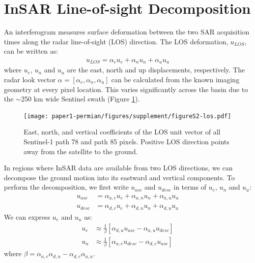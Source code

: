 \section{InSAR Line-of-sight Decomposition}
\label{sec:ch3-insar-decomp}
An interferogram measures surface deformation between the two SAR acquisition times along the radar line-of-sight (LOS) direction. The LOS deformation, $u_{LOS}$, can be written as: 
\begin{align}
	u_{LOS}= \alpha_{e} u_{e} + \alpha_{n} u_{n} + \alpha_{u} u_{u}
\end{align}
where $u_{e}$, $u_{n}$ and $u_{u}$ are the east, north and up displacements, respectively. The radar look vector $\alpha = [\alpha_e, \alpha_n, \alpha_u]$ can be calculated from the known imaging geometry at every pixel location. This varies significantly across the basin due to the $ \sim$250 km wide Sentinel swath (Figure \ref{fig:los-map}). 


%

\begin{figure}[!htbp]
	\centering
	\texttt{[image: paper1-permian/figures/supplement/figureS2-los.pdf]}
	\caption[East, north, and vertical coefficients of Sentinel-1 LOS vectors]{East, north, and vertical coefficients of the LOS unit vector of all Sentinel-1 path 78 and path 85 pixels. Positive LOS direction points away from the satellite to the ground.}
	\label{fig:los-map}
\end{figure}

In regions where InSAR data are available from two LOS directions, we can decompose the ground motion into its eastward and vertical components.
To perform the decomposition, we first write $u_{asc}$ and $u_{desc}$ in terms of $u_e$, $u_n$ and $u_u$:
\begin{align}
	u_{asc} &= \alpha_{a,e} u_{e} + \alpha_{a,n} u_{n} + \alpha_{a,u} u_{u}\\
	u_{desc} &= \alpha_{d,e} u_{e} + \alpha_{d,n} u_{n} + \alpha_{d,u} u_{u}
\end{align}
We can express $u_e$ and $u_u$ as:
\begin{align}
	u_{e} &\approx  \frac{1}{\beta}  \left[\alpha_{d,u}  u_{asc} - \alpha_{a,u} u_{desc} \right] \\
	u_{u} &\approx  \frac{1}{\beta}  \left[\alpha_{a,e} u_{desc} - \alpha_{d,e}  u_{asc}  \right] 
\end{align}
where  $ \beta = {\alpha_{a,e} \alpha_{d,u}- \alpha_{d,e} \alpha_{a,u}} $.

